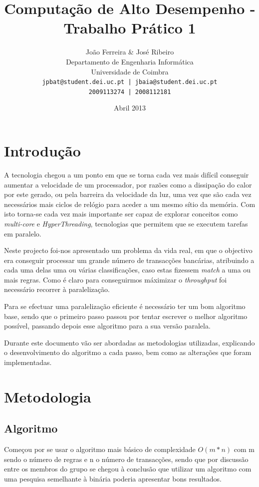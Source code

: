 \documentclass[a4paper]{article}
\title{Computação de Alto Desempenho - Trabalho Prático 1}
\author{João Ferreira \& José Ribeiro\\
		Departamento de Engenharia Informática\\
		Universidade de Coimbra\\
		\texttt{jpbat@student.dei.uc.pt | jbaia@student.dei.uc.pt}\\
		\texttt{2009113274 | 2008112181}}
\date{Abril 2013}
\begin{document}
\maketitle

\cleardoublepage

\tableofcontents
\cleardoublepage

\setlength{\parindent}{1cm}
\setlength{\parskip}{0.3cm}

\section{Introdução}
\indent \indent A tecnologia chegou a um ponto em que se torna cada vez mais difícil conseguir aumentar a velocidade de um processador, por razões como a dissipação do calor por este gerado, ou pela barreira da velocidade da luz, uma vez que são cada vez necessários mais ciclos de relógio para aceder a um mesmo sítio da memória. Com isto torna-se cada vez mais importante ser capaz de explorar conceitos como \textit{multi-core} e \textit{HyperThreading}, tecnologias que permitem que se executem tarefas em paralelo.

Neste projecto foi-nos apresentado um problema da vida real, em que o objectivo era conseguir processar um grande número de transacções bancárias, atribuindo a cada uma delas uma ou várias classificações, caso estas fizessem \textit{match} a uma ou mais regras. Como é claro para conseguirmos máximizar o \textit{throughput} foi necessário recorrer à paralelização.

Para se efectuar uma paralelização eficiente é necessário ter um bom algoritmo base, sendo que o primeiro passo passou por tentar escrever o melhor algoritmo possível, passando depois esse algoritmo para a sua versão paralela.

Durante este documento vão ser abordadas as metodologias utilizadas, explicando o desenvolvimento do algoritmo a cada passo, bem como as alterações que foram implementadas. 
\clearpage

\section{Metodologia}
\subsection{Algoritmo}
\indent \indent Começou por se usar o algoritmo mais básico de complexidade $O(m * n)$ com m sendo o número de regras e n o número de transacções, sendo que por discussão entre os membros do grupo se chegou à conclusão que utilizar um algoritmo com uma pesquisa semelhante à binária poderia apresentar bons resultados.
\end{document}
